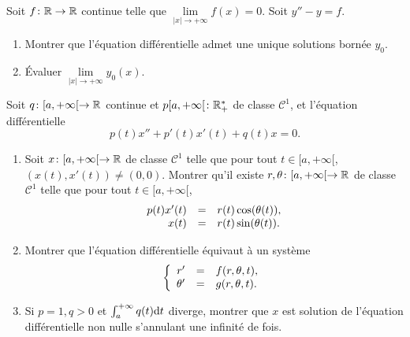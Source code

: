 \documentclass[12pt]{article}
\begin{document}
\begin{exercise}
	Soit $f\colon\mathbb{R}\to\mathbb{R}$ continue telle que $\lim\limits_{\left\lvert x\right\rvert\to+\infty}f(x)=0$. Soit $y''-y=f$. 
	\begin{enumerate}
		\item Montrer que l'équation différentielle admet une unique solutions bornée $y_0$.
		\item Évaluer $\lim\limits_{\left\lvert x\right\rvert\to+\infty}y_0(x)$.
	\end{enumerate}
\end{exercise}

\begin{exercise}
	Soit $q\colon[a,+\infty[\to\mathbb{R}$ continue et $p[a,+\infty[\colon\mathbb{R}_{+}^{*}$ de classe $\mathcal{C}^{1}$, et l'équation différentielle 
	\begin{equation}
		p(t)x''+p'(t)x'(t)+q(t)x=0.
	\end{equation}
	\begin{enumerate}
		\item Soit $x\colon[a,+\infty[\to\mathbb{R}$ de classe $\mathcal{C}^{1}$ telle que pour tout $t\in[a,+\infty[$, $(x(t),x'(t))\neq(0,0)$. Montrer qu'il existe $r,\theta\colon[a,+\infty[\to\mathbb{R}$ de classe $\mathcal{C}^{1}$ telle que pour tout $t\in[a,+\infty[$,
		\begin{equation}
			\begin{array}[]{rcl}
				p(t)x'(t)&=&r(t)\cos(\theta(t)),\\
				x(t)&=&r(t)\sin(\theta(t)).
			\end{array}
		\end{equation}

		\item Montrer que l'équation différentielle équivaut à un système
		\begin{equation}
			\left\lbrace
				\begin{array}[]{rcl}
					r'&=&f(r,\theta,t),\\
					\theta'&=&g(r,\theta,t).
				\end{array}
			\right.
		\end{equation}

		\item Si $p=1,q>0$ et $\int_{a}^{+\infty}q(t)\mathrm{d} t$ diverge, montrer que $x$ est solution de l'équation différentielle non nulle s'annulant une infinité de fois.
	\end{enumerate}
\end{exercise}
\end{document}

